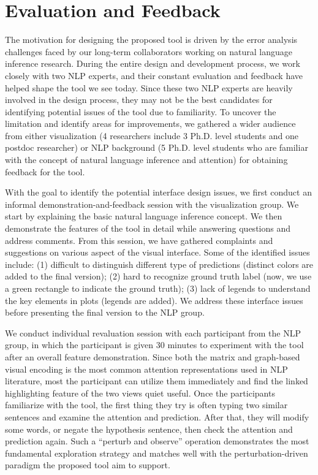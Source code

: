 \section{Evaluation and Feedback}
The motivation for designing the proposed tool is driven by the error analysis challenges faced by our long-term collaborators working on natural language inference research. During the entire design and development process, we work closely with two NLP experts, and their constant evaluation and feedback have helped shape the tool we see today. 
%
Since these two NLP experts are heavily involved in the design process, they may not be the best candidates for identifying potential issues of the tool due to familiarity.  To uncover the limitation and identify areas for improvements, we gathered a wider audience from either visualization (4 researchers include 3 Ph.D. level students and one postdoc researcher) or NLP background (5 Ph.D. level students who are familiar with the concept of natural language inference and attention) for obtaining feedback for the tool.  

With the goal to identify the potential interface design issues, we first conduct an informal demonstration-and-feedback session with the visualization group. We start by explaining the basic natural language inference concept. We then demonstrate the features of the tool in detail while answering questions and address comments.
%
From this session, we have gathered complaints and suggestions on various aspect of the visual interface. Some of the identified issues include: (1) difficult to distinguish different type of predictions (distinct colors are added to the final version); (2) hard to recognize ground truth label (now, we use a green rectangle to indicate the ground truth); (3) lack of legends to understand the key elements in plots (legends are added). We address these interface issues before presenting the final version to the NLP group.

We conduct individual revaluation session with each participant from the NLP group, in which the participant is given 30 minutes to experiment with the tool after an overall feature demonstration. 
%
Since both the matrix and graph-based visual encoding is the most common attention representations used in NLP literature, most the participant can utilize them immediately and find the linked highlighting feature of the two views quiet useful.
% 
Once the participants familiarize with the tool, the first thing they try is often typing two similar sentences and examine the attention and prediction. After that, they will modify some words, or negate the hypothesis sentence, then check the attention and prediction again.
%
Such a ``perturb and observe'' operation demonstrates the most fundamental exploration strategy and matches well with the perturbation-driven paradigm the proposed tool aim to support.

